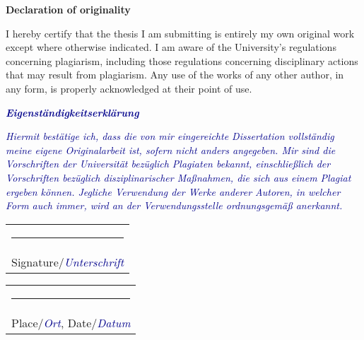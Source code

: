 \newpage

\vfill\noindent
\begin{center}
  \textbf{Declaration of originality}
\end{center}

I hereby certify that the thesis I am submitting is entirely my own original work except where otherwise indicated. I am aware of the University's regulations concerning plagiarism, including those regulations concerning disciplinary actions that may result from plagiarism. Any use of the works of any other author, in any form, is properly acknowledged at their point of use.

\begin{center}\bfseries{\textbf{\textit{\textcolor{darkblue}{Eigenständigkeitserklärung}}}}
\end{center}

    \textit{\textcolor{darkblue}{
        Hiermit bestätige ich, dass die von mir eingereichte Dissertation vollständig meine eigene Originalarbeit ist, sofern nicht anders angegeben. Mir sind die Vorschriften der Universität bezüglich Plagiaten bekannt, einschließlich der Vorschriften bezüglich disziplinarischer Maßnahmen, die sich aus einem Plagiat ergeben können. Jegliche Verwendung der Werke anderer Autoren, in welcher Form auch immer, wird an der Verwendungsstelle ordnungsgemäß anerkannt.
    }}


\vspace*{80px}
\noindent
\hfill%
\begin{tabular}[t]{c}
  \rule{15em}{0.4pt}\\ Signature/\textit{\textcolor{darkblue}{Unterschrift}}
\end{tabular}%
\hfill%
\begin{tabular}[t]{c}
  \rule{15em}{0.4pt}\\ Place/\textit{\textcolor{darkblue}{Ort}},\hspace{3px} Date/\textit{\textcolor{darkblue}{Datum}}
\end{tabular}%
\hfill\strut
\newpage


